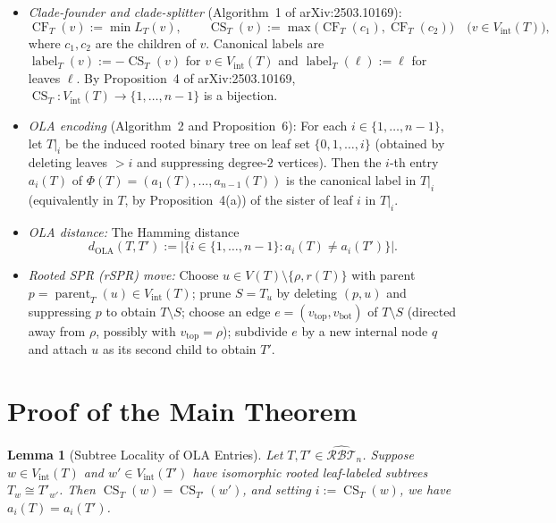 \documentclass[11pt]{article}
\newtheorem{lemma}[theorem]{Lemma}
\theoremstyle{definition}
\theoremstyle{remark}
\DeclareMathOperator{\CF}{CF}
\DeclareMathOperator{\CS}{CS}
\DeclareMathOperator{\labelop}{label}
\DeclareMathOperator{\parent}{parent}
\begin{document}
\begin{itemize}[leftmargin=2em,itemsep=4pt]
  \item \emph{Clade-founder and clade-splitter} (Algorithm~1 of arXiv:2503.10169):
  \[
    \CF_T(v) := \min L_T(v),
    \qquad
    \CS_T(v) := \max\bigl(\CF_T(c_1), \CF_T(c_2)\bigr) \quad \bigl(v \in V_{\mathrm{int}}(T)\bigr),
  \]
  where $c_1, c_2$ are the children of $v$. Canonical labels are $\labelop_T(v) := -\CS_T(v)$ for $v \in V_{\mathrm{int}}(T)$ and $\labelop_T(\ell) := \ell$ for leaves $\ell$. By Proposition~4 of arXiv:2503.10169, $\CS_T : V_{\mathrm{int}}(T) \to \{1, \dots, n-1\}$ is a bijection.

  \item \emph{OLA encoding} (Algorithm~2 and Proposition~6): For each $i \in \{1, \dots, n-1\}$, let $T|_i$ be the induced rooted binary tree on leaf set $\{0, 1, \dots, i\}$ (obtained by deleting leaves $> i$ and suppressing degree-$2$ vertices). Then the $i$-th entry $a_i(T)$ of $\Phi(T) = (a_1(T), \dots, a_{n-1}(T))$ is the canonical label in $T|_i$ (equivalently in $T$, by Proposition~4(a)) of the sister of leaf $i$ in $T|_i$.

  \item \emph{OLA distance:} The Hamming distance
  \[
    d_{\mathrm{OLA}}(T, T') := \bigl|\bigl\{i \in \{1, \dots, n-1\} : a_i(T) \neq a_i(T')\bigr\}\bigr|.
  \]

  \item \emph{Rooted SPR (rSPR) move:} Choose $u \in V(T) \setminus \{\rho, r(T)\}$ with parent $p = \parent_T(u) \in V_{\mathrm{int}}(T)$; prune $S = T_u$ by deleting $(p, u)$ and suppressing $p$ to obtain $T \setminus S$; choose an edge $e = (v_{\mathrm{top}}, v_{\mathrm{bot}})$ of $T \setminus S$ (directed away from $\rho$, possibly with $v_{\mathrm{top}} = \rho$); subdivide $e$ by a new internal node $q$ and attach $u$ as its second child to obtain $T'$.
\end{itemize}

\section{Proof of the Main Theorem}

\begin{lemma}[Subtree Locality of OLA Entries]\label{lem:locality}
Let $T, T' \in \widehat{\mathcal{RBT}}_n$. Suppose $w \in V_{\mathrm{int}}(T)$ and $w' \in V_{\mathrm{int}}(T')$ have isomorphic rooted leaf-labeled subtrees $T_w \cong T'_{w'}$. Then $\CS_T(w) = \CS_{T'}(w')$, and setting $i := \CS_T(w)$, we have $a_i(T) = a_i(T')$.
\end{lemma}
\end{document}
